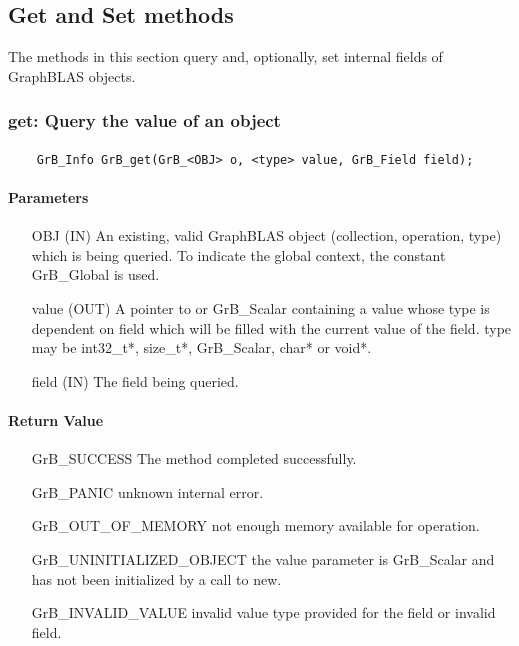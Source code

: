 \subsection{Get and Set methods}

The methods in this section query and, optionally, 
set internal fields of GraphBLAS objects.

\subsubsection{{\sf get}: Query the value of an object}

\paragraph{\syntax}

\begin{verbatim}
    GrB_Info GrB_get(GrB_<OBJ> o, <type> value, GrB_Field field);
\end{verbatim}

\paragraph{Parameters}

\begin{itemize}[leftmargin=1.1in]
    \item[{\sf OBJ}] ({\sf IN}) An existing, valid GraphBLAS object (collection, operation, type) which is being queried.
                                To indicate the global context, the constant {\sf GrB\_Global} is used.
    \item[{\sf value}] ({\sf OUT}) A pointer to or {\sf GrB\_Scalar} containing a value whose type is dependent on {\sf field} which will be
                                 filled with the current value of the field. {\sf type} may be {\sf int32\_t*}, {\sf size\_t*},
                                 {\sf GrB\_Scalar}, {\sf char*} or {\sf void*}.
    \item[{\sf field}] ({\sf IN}) The field being queried.
\end{itemize}

\paragraph{Return Value}

\begin{itemize}[leftmargin=2.1in]
\item[{\sf GrB\_SUCCESS}]  The method completed successfully.
\item[{\sf GrB\_PANIC}]             unknown internal error.
\item[{\sf GrB\_OUT\_OF\_MEMORY}]          not enough memory available for operation.
\item[{\sf GrB\_UNINITIALIZED\_OBJECT}]          the {\sf value} parameter is {\sf GrB\_Scalar} and has not been
                                    initialized by a call to {\sf new}.
\item[{\sf GrB\_INVALID\_VALUE}]    invalid value type provided for the field or invalid field.
\end{itemize}

